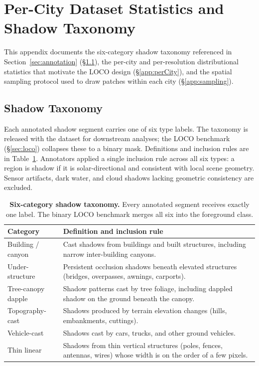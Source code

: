 \section{Per-City Dataset Statistics and Shadow Taxonomy}
\label{app:data_stats}

This appendix documents the six-category shadow taxonomy referenced in
Section~\ref{sec:annotation} (\S\ref{app:taxonomy}), the per-city and
per-resolution distributional statistics that motivate the LOCO design
(\S\ref{app:perCity}), and the spatial sampling protocol used to draw
patches within each city (\S\ref{app:sampling}).

\subsection{Shadow Taxonomy}
\label{app:taxonomy}

Each annotated shadow segment carries one of six type labels. The taxonomy
is released with the dataset for downstream analyses; the LOCO benchmark
(\S\ref{sec:loco}) collapses these to a binary mask. Definitions and
inclusion rules are in Table~\ref{tab:taxonomy}. Annotators applied a
single inclusion rule across all six types: a region is shadow if it is
solar-directional and consistent with local scene geometry. Sensor
artifacts, dark water, and cloud shadows lacking geometric consistency are
excluded.

\begin{table}[h]
  \centering
  \small
  \setlength{\tabcolsep}{4pt}
  \caption{
    \textbf{Six-category shadow taxonomy.}
    Every annotated segment receives exactly one label.
    The binary LOCO benchmark merges all six into the foreground class.
  }
  \label{tab:taxonomy}
  \begin{tabular}{@{}p{3.0cm}p{9.5cm}@{}}
    \toprule
    \textbf{Category} & \textbf{Definition and inclusion rule} \\
    \midrule
    Building / canyon &
    Cast shadows from buildings and built structures, including narrow
    inter-building canyons. \\
    Under-structure &
    Persistent occlusion shadows beneath elevated structures (bridges,
    overpasses, awnings, carports). \\
    Tree-canopy dapple &
    Shadow patterns cast by tree foliage, including dappled shadow on the
    ground beneath the canopy. \\
    Topography-cast &
    Shadows produced by terrain elevation changes (hills, embankments,
    cuttings). \\
    Vehicle-cast &
    Shadows cast by cars, trucks, and other ground vehicles. \\
    Thin linear &
    Shadows from thin vertical structures (poles, fences, antennas, wires)
    whose width is on the order of a few pixels. \\
    \bottomrule
  \end{tabular}
\end{table}

